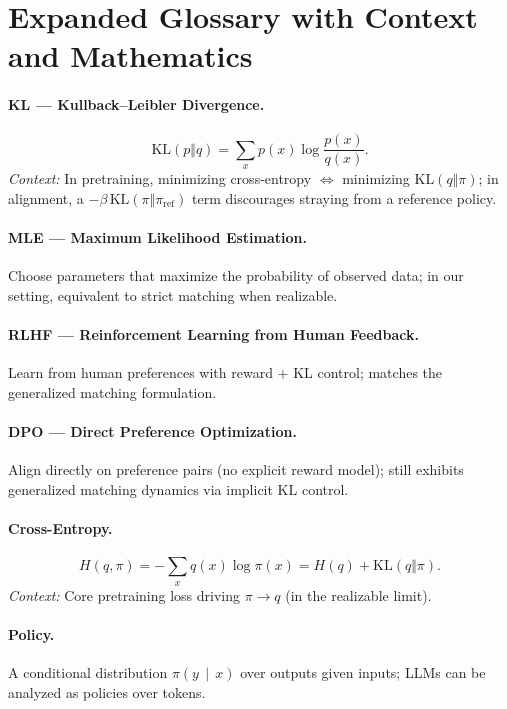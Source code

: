 \documentclass[11pt]{article}
\newcommand{\KL}{\mathrm{KL}}
\newcommand{\given}{\,\mid\,}
\begin{document}
\section{Expanded Glossary with Context and Mathematics}

\paragraph{KL — Kullback–Leibler Divergence.}
\[
\KL(p\Vert q)=\sum_x p(x)\log\frac{p(x)}{q(x)}.
\]
\emph{Context:} In pretraining, minimizing cross-entropy $\Leftrightarrow$ minimizing $\KL(q\Vert \pi)$; in alignment, a $-\beta\,\KL(\pi\Vert \pi_{\mathrm{ref}})$ term discourages straying from a reference policy.

\paragraph{MLE — Maximum Likelihood Estimation.}
Choose parameters that maximize the probability of observed data; in our setting, equivalent to strict matching when realizable.

\paragraph{RLHF — Reinforcement Learning from Human Feedback.}
Learn from human preferences with reward + KL control; matches the generalized matching formulation.

\paragraph{DPO — Direct Preference Optimization.}
Align directly on preference pairs (no explicit reward model); still exhibits generalized matching dynamics via implicit KL control.

\paragraph{Cross-Entropy.}
\[
H(q,\pi)=-\sum_x q(x)\log \pi(x)=H(q)+\KL(q\Vert \pi).
\]
\emph{Context:} Core pretraining loss driving $\pi\to q$ (in the realizable limit).

\paragraph{Policy.}
A conditional distribution $\pi(y\given x)$ over outputs given inputs; LLMs can be analyzed as policies over tokens.
\end{document}
